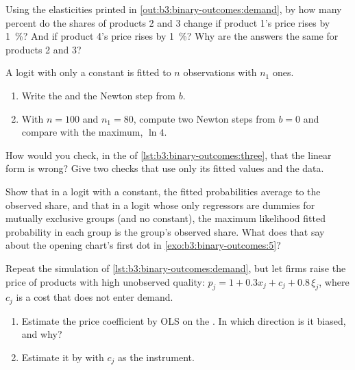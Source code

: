 \begin{exercise}[$\star\star$]\label{exo:b3:binary-outcomes:7}
Using the elasticities printed in \cref{out:b3:binary-outcomes:demand}, by how
many percent do the shares of products 2 and 3 change if product 1's price rises
by 1~\%? And if product 4's price rises by 1~\%? Why are the answers the same for
products 2 and 3?
\end{exercise}

\begin{exercise}[$\star\star$]\label{exo:b3:binary-outcomes:8}
A logit with only a constant is fitted to $n$ observations with $n_1$ ones.
\begin{enumerate}
\item Write the  and the Newton step from $b$.
\item With $n = 100$ and $n_1 = 80$, compute two Newton steps from $b = 0$ and
compare with the maximum, $\ln 4$.
\end{enumerate}
\end{exercise}

\begin{exercise}[$\star\star$]\label{exo:b3:binary-outcomes:9}
How would you check, in the  of
\cref{lst:b3:binary-outcomes:three}, that the linear form is wrong? Give two
checks that use only its fitted values and the data.
\end{exercise}

\begin{exercise}[$\star\star\star$]\label{exo:b3:binary-outcomes:10}
Show that in a logit with a constant, the fitted probabilities average to the
observed share, and that in a logit whose only regressors are dummies for
mutually exclusive groups (and no constant), the maximum likelihood fitted
probability in each group is the group's observed share. What does that say
about the opening chart's first dot in \cref{exo:b3:binary-outcomes:5}?
\end{exercise}

\begin{exercise}[$\star\star\star$]\label{exo:b3:binary-outcomes:11}
Repeat the simulation of \cref{lst:b3:binary-outcomes:demand}, but let firms
raise the price of products with high unobserved quality: $p_j = 1 + 0.3 x_j +
c_j + 0.8\,\xi_j$, where $c_j$ is a cost that does not enter demand.
\begin{enumerate}
\item Estimate the price coefficient by OLS on the . In which
direction is it biased, and why?
\item Estimate it by  with $c_j$ as the instrument.
\end{enumerate}
\end{exercise}

